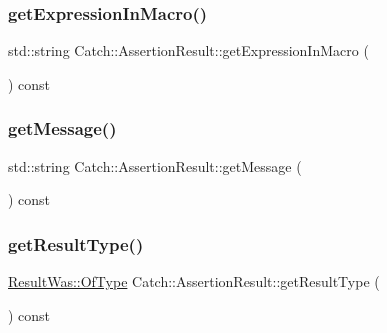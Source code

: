 \hypertarget{class_catch_1_1_assertion_result_aac35a0ca42d33bff6467c76573730f5e}{}\label{class_catch_1_1_assertion_result_aac35a0ca42d33bff6467c76573730f5e} 
\subsubsection{\texorpdfstring{get\+Expression\+In\+Macro()}{getExpressionInMacro()}}
{\footnotesize\ttfamily std\+::string Catch\+::\+Assertion\+Result\+::get\+Expression\+In\+Macro (\begin{DoxyParamCaption}{ }\end{DoxyParamCaption}) const}

\hypertarget{class_catch_1_1_assertion_result_ae730943beed46921b09383c673e35786}{}\label{class_catch_1_1_assertion_result_ae730943beed46921b09383c673e35786} 
\subsubsection{\texorpdfstring{get\+Message()}{getMessage()}}
{\footnotesize\ttfamily std\+::string Catch\+::\+Assertion\+Result\+::get\+Message (\begin{DoxyParamCaption}{ }\end{DoxyParamCaption}) const}

\hypertarget{class_catch_1_1_assertion_result_ac810750194e1722489d2fd16e8c6a4a8}{}\label{class_catch_1_1_assertion_result_ac810750194e1722489d2fd16e8c6a4a8} 
\subsubsection{\texorpdfstring{get\+Result\+Type()}{getResultType()}}
{\footnotesize\ttfamily \hyperlink{struct_catch_1_1_result_was_a624e1ee3661fcf6094ceef1f654601ef}{Result\+Was\+::\+Of\+Type} Catch\+::\+Assertion\+Result\+::get\+Result\+Type (\begin{DoxyParamCaption}{ }\end{DoxyParamCaption}) const}

